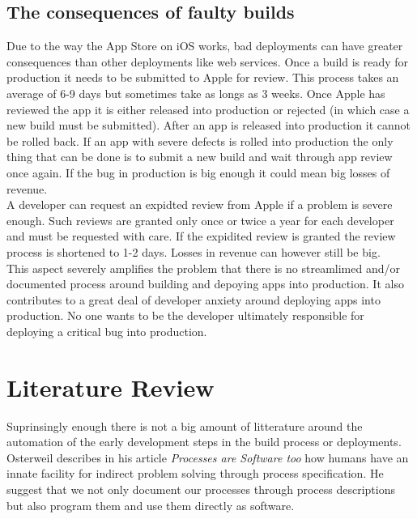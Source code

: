 \documentclass{ituthesis}
\begin{document}
\section{The consequences of faulty builds}
\label{sec:consequences_of_faulty_builds}

Due to the way the App Store on iOS works, bad deployments can have greater consequences than other deployments like web services. Once a build is ready for production it needs to be submitted to Apple for review. This process takes an average of 6-9 days but sometimes take as longs as 3 weeks. Once Apple has reviewed the app it is either released into production or rejected (in which case a new build must be submitted). After an app is released into production it cannot be rolled back. If an app with severe defects is rolled into production the only thing that can be done is to submit a new build and wait through app review once again. If the bug in production is big enough it could mean big losses of revenue.\\

A developer can request an expidted review from Apple if a problem is severe enough. Such reviews are granted only once or twice a year for each developer and must be requested with care. If the expidited review is granted the review process is shortened to 1-2 days. Losses in revenue can however still be big.\\

This aspect severely amplifies the problem that there is no streamlimed and/or documented process around building and depoying apps into production. It also contributes to a great deal of developer anxiety around deploying apps into production. No one wants to be the developer ultimately responsible for deploying a critical bug into production.

\chapter{Literature Review}
\label{ch:literature_review}

Suprinsingly enough there is not a big amount of litterature around the automation of the early development steps in the build process or deployments.\\

Osterweil \cite{Osterweil1997} describes in his article \textit{Processes are Software too} how humans have an innate facility for indirect problem solving through process specification. He suggest that we not only document our processes through process descriptions but also program them and use them directly as software.\\
\end{document}
